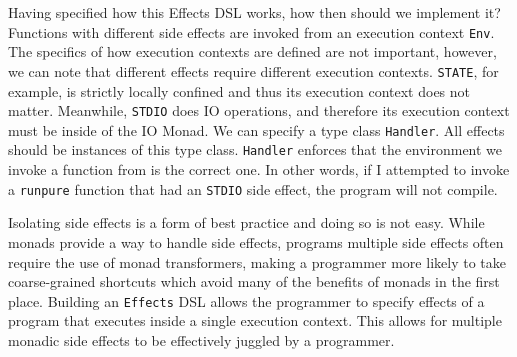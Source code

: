 Having specified how this Effects DSL works, how then should we implement it?
Functions with different side effects are invoked from an execution context
\texttt{Env}. The specifics of how execution contexts are defined are not
important, however, we can note that different effects require different
execution contexts. \texttt{STATE}, for example, is strictly locally confined
and thus its execution context does not matter. Meanwhile, \texttt{STDIO} does
IO operations, and therefore its execution context must be inside of the IO
Monad. We can specify a type class \texttt{Handler}. All effects should be
instances of this type class. \texttt{Handler} enforces that the environment we
invoke a function from is the correct one. In other words, if I attempted to
invoke a \texttt{runpure} function that had an \texttt{STDIO} side effect, the
program will not compile. 

Isolating side effects is a form of best practice and doing so is not easy.
While monads provide a way to handle side effects, programs multiple side
effects often require the use of monad transformers, making a programmer more
likely to take coarse-grained shortcuts which avoid many of the benefits of
monads in the first place. Building an \texttt{Effects} DSL allows the
programmer to specify effects of a program that executes inside a single
execution context. This allows for multiple monadic side effects to be
effectively juggled by a programmer. 